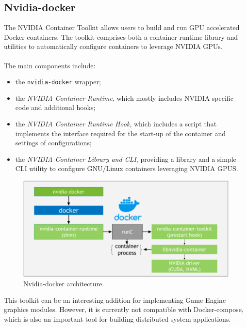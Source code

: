 \subsection{Nvidia-docker}
The NVIDIA Container Toolkit allows users to build and run GPU accelerated Docker containers. The toolkit comprises both a container runtime library and utilities to automatically configure containers to leverage NVIDIA GPUs. \\ \\
The main components include:
\begin{itemize}
	\item the \texttt{nvidia-docker} wrapper;
	\item the \textit{NVIDIA Container Runtime}, which mostly includes NVIDIA specific code and additional hooks;
	\item the\textit{ NVIDIA Container Runtime Hook}, which includes a script that implements the interface required for the start-up of the container and settings of configurations;
	\item the \textit{NVIDIA Container Library and CLI}, providing a library and a simple CLI utility to configure GNU/Linux containers leveraging NVIDIA GPUS.
\end{itemize}
\begin{figure}[h!]
	\centering
	\includegraphics[width=0.9\linewidth]{immagini/Technologies/nvidia-docker-arch-new}
	\caption[Nvidia-docker architecture.]{Nvidia-docker architecture.}
	\label{fig:nvidia-docker-arch-new}
\end{figure}
This toolkit can be an interesting addition for implementing Game Engine graphics modules. However, it is currently not compatible with Docker-compose, which is also an important tool for building distributed system applications.

